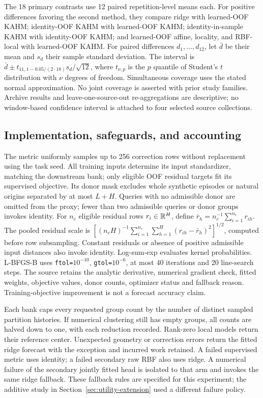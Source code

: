 The 18 primary contrasts use 12 paired repetition-level means each.
For positive differences favoring the second method, they compare
ridge with learned-OOF KAHM; identity-OOF KAHM with learned-OOF KAHM;
identity-in-sample KAHM with identity-OOF KAHM; and learned-OOF affine,
locality, and RBF-local with learned-OOF KAHM. For paired differences $d_1,\ldots,d_{12}$, let $\bar d$ be their
mean and $s_d$ their sample standard deviation. The interval is
$\bar d\pm t_{11,1-0.05/(2\cdot18)}s_d/\sqrt{12}$, where
$t_{\nu,p}$ is the $p$ quantile of Student's $t$ distribution with
$\nu$ degrees of freedom. Simultaneous coverage uses the stated
normal approximation. No joint coverage is asserted with prior study
families. Archive results and leave-one-source-out re-aggregations are
descriptive; no window-based confidence interval is attached to four
selected source collections.

\subsection{Implementation, safeguards, and accounting}
\label{app:target-implementation}

The metric uniformly samples up to 256 correction rows without
replacement using the task seed. All training inputs determine its
input standardizer, matching the downstream bank; only eligible OOF
residual targets fit its supervised objective. Its donor mask excludes
whole synthetic episodes or natural origins separated by at most
$L+H$. Queries with no admissible donor are omitted from the proxy;
fewer than two admissible queries or donor groups invokes identity.
For $n_c$ eligible residual rows $r_i\in\mathbb{R}^H$, define
$\bar r_h=n_c^{-1}\sum_{i=1}^{n_c}r_{ih}$. The pooled residual scale is
$[ (n_cH)^{-1}\sum_{i=1}^{n_c}\sum_{h=1}^{H}(r_{ih}-\bar r_h)^2]^{1/2}$,
computed before row subsampling.
Constant residuals or absence of positive admissible input distances
also invoke identity. Log-sum-exp evaluates kernel probabilities.
L-BFGS-B uses \texttt{ftol=$10^{-10}$},
\texttt{gtol=$10^{-6}$}, at most 40 iterations and 20 line-search
steps. The source retains the analytic derivative, numerical gradient
check, fitted weights, objective values, donor counts, optimizer status
and fallback reason. Training-objective improvement is not a forecast
accuracy claim.

Each bank caps every requested group count by the number of distinct
sampled partition histories. If numerical clustering still has empty
groups, all counts are halved down to one, with each reduction recorded.
Rank-zero local models return their reference center.
Unexpected geometry or correction errors return the fitted ridge
forecast with the exception and incurred work retained. A failed
supervised metric uses identity; a failed secondary raw RBF also uses
ridge. A numerical failure of the secondary jointly fitted head is
isolated to that arm and invokes the same ridge fallback. These fallback rules are specified for this experiment; the additive
study in Section~\ref{sec:utility-extension} used a different failure policy.

